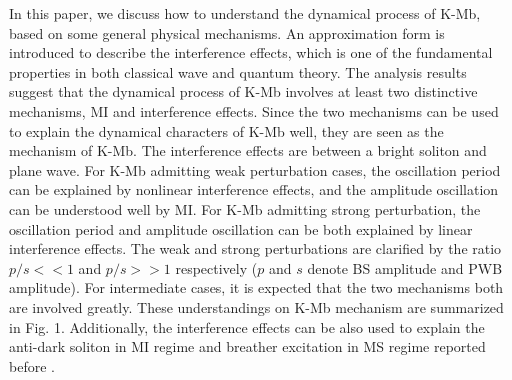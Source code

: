 \documentclass[aps,twocolumn,showpacs]{revtex4}
\begin{document}
In this paper, we discuss how to understand the dynamical process of K-Mb, based on some general physical mechanisms. An approximation form is introduced to describe the interference effects, which is one of the fundamental properties in both classical wave and quantum theory. The analysis results suggest that the dynamical process of K-Mb involves at least two distinctive mechanisms, MI and interference effects. Since the two mechanisms can be used to explain the dynamical characters of K-Mb well, they are seen as the mechanism of K-Mb.  The interference effects are between a bright soliton and plane wave. For K-Mb admitting weak perturbation cases,  the oscillation period can be explained by nonlinear interference effects, and the amplitude oscillation can be understood well by MI. For K-Mb admitting strong perturbation, the oscillation period and amplitude oscillation can be both explained by linear interference effects. The weak and strong perturbations are clarified by the ratio $p/s<< 1$ and $p/s>>1$ respectively ($p$ and $s$ denote BS amplitude and PWB amplitude).  For intermediate cases, it is expected that the two mechanisms both are involved greatly. These understandings on K-Mb mechanism are summarized in Fig. 1. Additionally, the interference effects can be also used to explain the anti-dark soliton in MI regime and breather excitation in MS regime reported before \cite{defnls,AD}.
\end{document}
